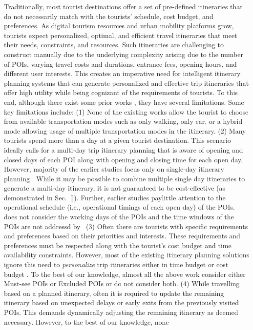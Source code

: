 \documentclass[sigconf,authordraft]{acmart}
\begin{document}
Traditionally, most tourist destinations offer a set of pre-defined itineraries that do not necessarily match with the tourists' schedule, cost budget, and preferences. As digital tourism resources and urban mobility platforms grow, tourists expect personalized, optimal, and efficient travel itineraries that meet their needs, constraints, and resources. 
Such itineraries are challenging to construct manually due to the underlying complexity arising due to the number of POIs, varying travel costs and durations, entrance fees, opening hours, and different user interests. This creates an imperative need for intelligent itinerary planning systems that can generate personalized and effective trip itineraries that offer high utility while being cognizant of the requirements of tourists. To this end, although there exist some prior works \cite{chen2014automatic, vanzelst2016itinerary, taylor2018tour, vu2022branch, panagiotakis2024expectation, liu2024personalized, rambha2024optimized, lim2018personalized, bolzoni2014efficient}, they have several limitations. Some key limitations include: (1) None of the existing works allow the tourist to choose from available transportation modes such as only walking, only car, or a hybrid mode allowing usage of multiple transportation modes in the itinerary. (2) Many tourists spend more than a day at a given tourist destination. This scenario ideally calls for a multi-day trip itinerary planning that is aware of opening and closed days of each POI along with opening and closing time for each open day. However, majority of the earlier studies focus only on single-day itinerary planning \cite{taylor2018tour, vu2022branch, panagiotakis2024expectation}.  While it may be possible to combine multiple single day itineraries to generate a multi-day itinerary, it is not guaranteed to be cost-effective (as demonstrated in Sec.~\ref{}). Further, earlier studies paylittle attention to the operational schedule (i.e., operational timings of each open day)  of the POIs. ~\cite{chen2014automatic, vanzelst2016itinerary, taylor2018tour, vu2022branch, panagiotakis2024expectation, liu2024personalized} does not consider the working days of the POIs and the time windows of the POIs are not addressd by~\cite{chen2014automatic, taylor2018tour, panagiotakis2024expectation} (3) Often there are tourists with specific requirements and preferences based on their priorities and interests. These requirements and preferences must be respected along with the tourist's cost budget and time availability constraints. However, most of the existing itinerary planning solutions ignore this need to \emph{personalize} trip itineraries either in time budget or cost budget \cite{chen2014automatic, vanzelst2016itinerary, taylor2018tour, vu2022branch, panagiotakis2024expectation, liu2024personalized, rambha2024optimized, lim2018personalized, bolzoni2014efficient}. To the best of our knowledge, almost all the above work consider either Must-see POIs or Excluded POIs or do not consider both. (4) While travelling based on a planned itinerary, often it is required to update the remaining itinerary based on unexpected delays or early exits from the previously visited POIs. This demands dynamically adjusting the remaining itinerary as deemed necessary. However, to the best of our knowledge, none 
\end{document}
